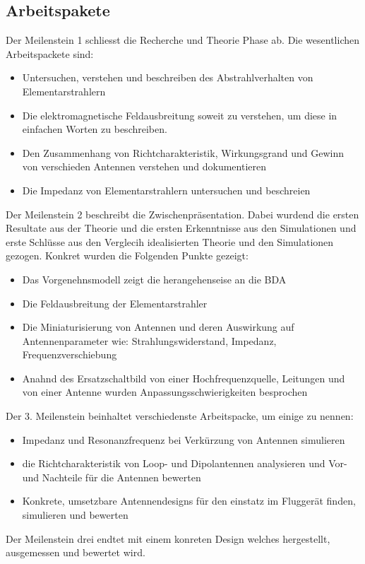 \subsection{Arbeitspakete}
Der Meilenstein 1 schliesst die Recherche und Theorie Phase ab. Die wesentlichen Arbeitspackete sind:
\begin{itemize}
\item Untersuchen, verstehen und beschreiben des Abstrahlverhalten von Elementarstrahlern
\item Die elektromagnetische Feldausbreitung soweit zu verstehen, um diese in einfachen Worten zu beschreiben.
\item Den Zusammenhang von Richtcharakteristik, Wirkungsgrand und Gewinn von verschieden Antennen verstehen und dokumentieren
\item Die Impedanz von Elementarstrahlern untersuchen und beschreien
\end{itemize}
Der Meilenstein 2 beschreibt die Zwischenpräsentation. Dabei wurdend die ersten Resultate aus der Theorie und die ersten Erkenntnisse aus den Simulationen und erste Schlüsse aus den Verglecih idealisierten Theorie und den Simulationen gezogen. 
Konkret wurden die Folgenden Punkte gezeigt:
\begin{itemize}
\item Das Vorgenehnsmodell zeigt die herangehenseise an die BDA
\item Die Feldausbreitung der Elementarstrahler
\item Die Miniaturisierung von Antennen und deren Auswirkung auf Antennenparameter wie: Strahlungswiderstand, Impedanz, Frequenzverschiebung
\item Anahnd des Ersatzschaltbild von einer Hochfrequenzquelle, Leitungen und von einer Antenne wurden Anpassungsschwierigkeiten besprochen
\end{itemize}
Der 3. Meilenstein beinhaltet verschiedenste Arbeitspacke, um einige zu nennen:
\begin{itemize}
\item Impedanz und Resonanzfrequenz  bei Verkürzung von Antennen simulieren
\item die Richtcharakteristik von Loop- und Dipolantennen analysieren und Vor- und Nachteile für die Antennen bewerten
\item Konkrete, umsetzbare Antennendesigns für den einstatz im Fluggerät finden, simulieren und bewerten
\end{itemize}
Der Meilenstein drei endtet mit einem konreten Design welches hergestellt, ausgemessen und bewertet wird.\\
